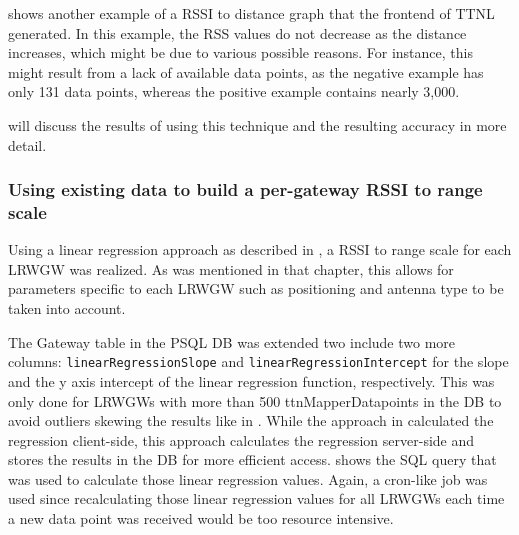  shows another example of a \ac{RSSI} to distance graph that the frontend of \ac{TTNL} generated.
In this example, the \ac{RSS} values do not decrease as the distance increases, which might be due to various possible reasons.
For instance, this might result from a lack of available data points, as the negative example has only 131 data points, whereas the positive example contains nearly 3,000.

 will discuss the results of using this technique and the resulting accuracy in more detail.

\subsubsection{Using existing data to build a per-gateway \acl{RSSI} to range scale}\label{subsubsec:per-gateway-rssi-to-range-scale}

Using a linear regression approach as described in , a \ac{RSSI} to range scale for each \acl{LRWGW} was realized.
As was mentioned in that chapter, this allows for parameters specific to each \acl{LRWGW} such as positioning and antenna type to be taken into account.

The Gateway table in the \ac{PSQL} \ac{DB} was extended two include two more columns: \texttt{linear\-Regres\-sion\-Slope} and \texttt{linear\-Re\-gres\-sion\-Inter\-cept} for the slope and the y axis intercept of the linear regression function, respectively.
This was only done for \aclp{LRWGW} with more than 500 ttnMapperDatapoints in the \ac{DB} to avoid outliers skewing the results like in .
While the approach in  calculated the regression client-side, this approach calculates the regression server-side and stores the results in the \ac{DB} for more efficient access.
 shows the \ac{SQL} query that was used to calculate those linear regression values.
Again, a cron-like job was used since recalculating those linear regression values for all \aclp{LRWGW} each time a new data point was received would be too resource intensive.

